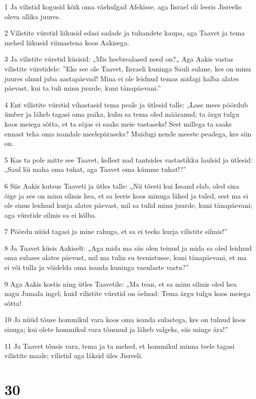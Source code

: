\par 1 Ja vilistid kogusid kõik oma väehulgad Afekisse, aga Iisrael oli leeris Jisreelis oleva allika juures.
\par 2 Vilistite vürstid liikusid edasi sadade ja tuhandete kaupa, aga Taavet ja tema mehed liikusid viimastena koos Aakisega.
\par 3 Ja vilistite vürstid küsisid: „Mis heebrealased need on?„ Aga Aakis vastas vilistite vürstidele: ”Eks see ole Taavet, Iisraeli kuninga Sauli sulane, kes on minu juures olnud juba aastapäevad! Mina ei ole leidnud temas midagi halba alates päevast, kui ta tuli minu juurde, kuni tänapäevani.”
\par 4 Ent vilistite vürstid vihastasid tema peale ja ütlesid talle: „Lase mees pöördub ümber ja läheb tagasi oma paika, kuhu sa tema oled määranud; ta ärgu tulgu koos meiega sõtta, et ta sõjas ei saaks meie vastaseks! Sest millega ta saaks ennast teha oma isandale meelepäraseks? Muidugi nende meeste peadega, kes siin on.
\par 5 Kas ta pole mitte see Taavet, kellest nad tantsides vastastikku laulsid ja ütlesid: „Saul lõi maha oma tuhat, aga Taavet oma kümme tuhat!?”
\par 6 Siis Aakis kutsus Taaveti ja ütles talle: „Nii tõesti kui Issand elab, oled sina õige ja see on minu silmis hea, et sa leeris koos minuga lähed ja tuled, sest ma ei ole sinus leidnud kurja alates päevast, mil sa tulid minu juurde, kuni tänapäevani; aga vürstide silmis sa ei kõlba.
\par 7 Pöördu nüüd tagasi ja mine rahuga, et sa ei teeks kurja vilistite silmis!”
\par 8 Ja Taavet küsis Aakiselt: „Aga mida ma siis olen teinud ja mida sa oled leidnud oma sulases alates päevast, mil ma tulin su teenistusse, kuni tänapäevani, et ma ei või tulla ja võidelda oma isanda kuninga vaenlaste vastu?”
\par 9 Aga Aakis kostis ning ütles Taavetile: „Ma tean, et sa minu silmis oled hea nagu Jumala ingel; kuid vilistite vürstid on öelnud: Tema ärgu tulgu koos meiega sõtta!
\par 10 Ja nüüd tõuse hommikul vara koos oma isanda sulastega, kes on tulnud koos sinuga; kui olete hommikul vara tõusnud ja läheb valgeks, siis minge ära!”
\par 11 Ja Taavet tõusis vara, tema ja ta mehed, et hommikul minna teele tagasi vilistite maale; vilistid aga läksid üles Jisreeli.

\chapter{30}

